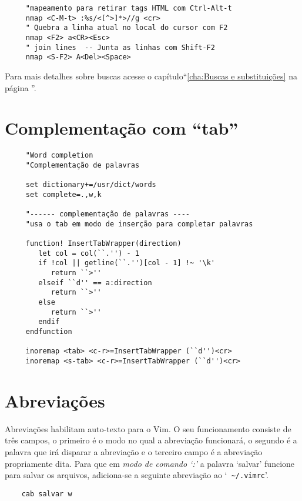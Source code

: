 \begin{verbatim}
     "mapeamento para retirar tags HTML com Ctrl-Alt-t
     nmap <C-M-t> :%s/<[^>]*>//g <cr>
     " Quebra a linha atual no local do cursor com F2
     nmap <F2> a<CR><Esc>
     " join lines  -- Junta as linhas com Shift-F2
     nmap <S-F2> A<Del><Space>
\end{verbatim}

Para mais detalhes sobre buscas acesse o capítulo``\ref{cha:Buscas e substituições}
na página \pageref{cha:Buscas e substituições}''.

\section{Complementação com ``tab''}\label{Complementação com ``tab''}

\begin{verbatim}
     "Word completion
     "Complementação de palavras
     
     set dictionary+=/usr/dict/words
     set complete=.,w,k
     
     "------ complementação de palavras ----
     "usa o tab em modo de inserção para completar palavras
     
     function! InsertTabWrapper(direction)
        let col = col(``.'') - 1
        if !col || getline(``.'')[col - 1] !~ '\k'
           return ``>''
        elseif ``d'' == a:direction
           return ``>''
        else
           return ``>''
        endif
     endfunction
     
     inoremap <tab> <c-r>=InsertTabWrapper (``d'')<cr>
     inoremap <s-tab> <c-r>=InsertTabWrapper (``d'')<cr>
\end{verbatim}

\section{Abreviações}\label{Abreviações}

Abreviações habilitam auto-texto para o Vim. O seu funcionamento consiste de
três campos, o primeiro é o modo no qual a abreviação funcionará, o segundo é a
palavra que irá disparar a abreviação e o terceiro campo é a abreviação
propriamente dita. Para que em {\em modo de comando `:'} a palavra `salvar'
funcione para salvar os arquivos, adiciona-se a seguinte abreviação ao `{\tt
\textasciitilde/.vimrc}'. 

\begin{verbatim}
    cab salvar w
\end{verbatim}

